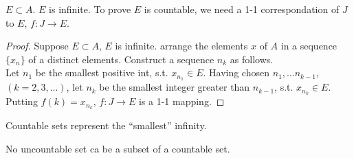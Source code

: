$E\subset A$. $E$ is infinite. 
To prove $E$ is countable, we need a 1-1 correspondation of $J$ to $E$, $f:J\rightarrow E$.

\begin{proof}
    Suppose $E\subset A$, $E$ is infinite. 
    arrange the elements $x$ of $A$ in a sequence $\{x_n\}$ of a distinct elements. Construct a sequence $n_k$ as follows.\\
    Let $n_1$ be the smallest positive int, s.t. $x_{n_1}\in E$.
    Having chosen $n_1,...n_{k-1}$,$(k=2,3,...)$, let $n_k$ be the smallest integer greater than $n_{k-1}$, s.t. $x_{n_k} \in E$.\\
    Putting $f(k) = x_{n_k}$, $f:J\rightarrow E$ is a 1-1 mapping.
\end{proof}

Countable sets represent the ``smallest'' infinity.

No uncountable set ca be a subset of a countable set.


